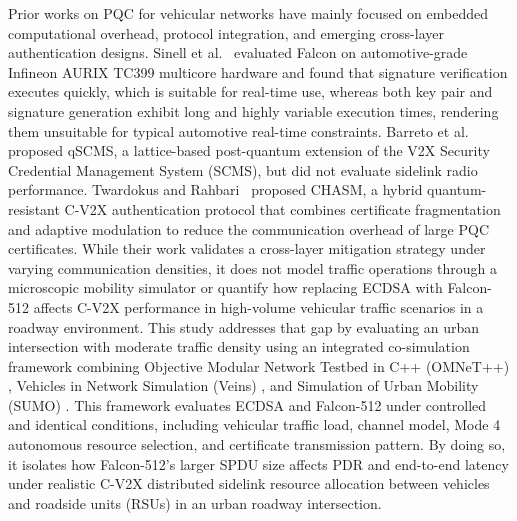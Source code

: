 \documentclass[conference]{IEEEtran}
\begin{document}
Prior works on PQC for vehicular networks have mainly focused on embedded computational overhead, protocol integration, and emerging cross-layer authentication designs. Sinell et al.~\cite{sinell2025evaluation} evaluated Falcon on automotive-grade Infineon AURIX TC399 multicore hardware and found that signature verification executes quickly, which is suitable for real-time use, whereas both key pair and signature generation exhibit long and highly variable execution times, rendering them unsuitable for typical automotive real-time constraints. Barreto et al.~\cite{barreto2018qscms} proposed qSCMS, a lattice-based post-quantum extension of the V2X Security Credential Management System (SCMS), but did not evaluate sidelink radio performance. Twardokus and Rahbari~\cite{twardokus2025chasm} proposed CHASM, a hybrid quantum-resistant C-V2X authentication protocol that combines certificate fragmentation and adaptive modulation to reduce the communication overhead of large PQC certificates. While their work validates a cross-layer mitigation strategy under varying communication densities, it does not model traffic operations through a microscopic mobility simulator or quantify how replacing ECDSA with Falcon-512 affects C-V2X performance in high-volume vehicular traffic scenarios in a roadway environment. This study addresses that gap by evaluating an urban intersection with moderate traffic density using an integrated co-simulation framework combining Objective Modular Network Testbed in C++ (OMNeT++) \cite{varga2008overview}, Vehicles in Network Simulation (Veins) \cite{sommer2019veins}, and Simulation of Urban Mobility (SUMO) \cite{behrisch2011sumo}. This framework evaluates ECDSA and Falcon-512 under controlled and identical conditions, including vehicular traffic load, channel model, Mode 4 autonomous resource selection, and certificate transmission pattern. By doing so, it isolates how Falcon-512’s larger SPDU size affects PDR and end-to-end latency under realistic C-V2X distributed sidelink resource allocation between vehicles and roadside units (RSUs) in an urban roadway intersection.
\end{document}
